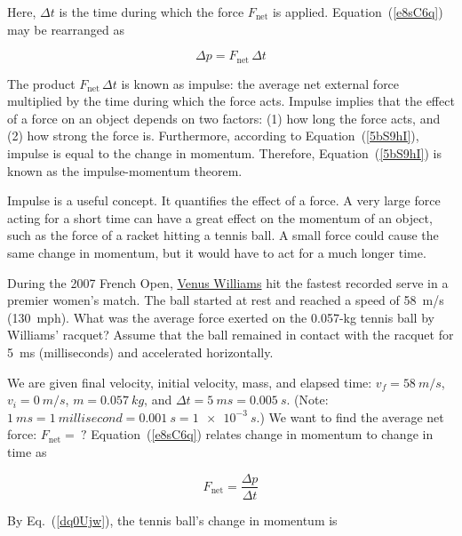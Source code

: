 \documentclass[main.tex]{subfiles}
\begin{document}
Here, $\Delta t$ is the time during which the force $F_{\text{net}}$ is applied. Equation~(\ref{e8sC6q}) may be rearranged as

\begin{equation} \label{5bS9hI}
    \Delta p = F_{\text{net}}\,\Delta t
\end{equation}

The product $F_{\text{net}}\,\Delta t$ is known as \gls{impulse}: the average net external force multiplied by the time during which the force acts. Impulse implies that the effect of a force on an object depends on two factors: (1) how long the force acts, and (2) how strong the force is. Furthermore, according to Equation~(\ref{5bS9hI}), impulse is equal to the change in momentum. Therefore, Equation~(\ref{5bS9hI}) is known as the \gls{impulse-momentum theorem}.
\vspace{1em}

Impulse is a useful concept. It quantifies the effect of a force. A very large force acting for a short time can have a great effect on the momentum of an object, such as the force of a racket hitting a tennis ball. A small force could cause the same change in momentum, but it would have to act for a much longer time.

\begin{example}
    During the 2007 French Open, \href{https://youtu.be/6b1NSgQZvdo}{Venus Williams} hit the fastest recorded serve in a premier women's match. The ball started at rest and reached a speed of \SI{58}{m/s} (\SI{130}{mph}). What was the average force exerted on the 0.057-kg tennis ball by Williams' racquet? Assume that the ball remained in contact with the racquet for \SI{5}{ms} (milliseconds) and accelerated horizontally.
\end{example}

\Solution We are given final velocity, initial velocity, mass, and elapsed time: $v_f = \SI{58}{m/s}$, $v_i = \SI{0}{m/s}$, $m = \SI{0.057}{kg}$, and $\Delta t = \SI{5}{ms} = \SI{0.005}{s}$. (Note: $\SI{1}{ms} = \SI{1}{millisecond} = \SI{0.001}{s} = \SI{1e-3}{s}$.) We want to find the average net force: $F_{\text{net}} =\ ?$ Equation~(\ref{e8sC6q}) relates change in momentum to change in time as

\begin{equation*}
    F_{\text{net}} = \frac{\Delta p}{\Delta t}
\end{equation*}

By Eq.~(\ref{dq0Ujw}), the tennis ball's change in momentum is
\end{document}
